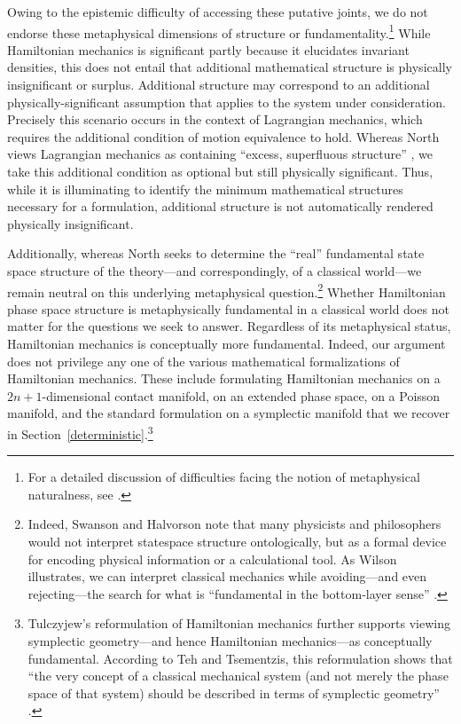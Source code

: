 \documentclass[12pt, english, twoside]{article} %
\begin{document}
Owing to the epistemic difficulty of accessing these putative joints, we do not endorse these metaphysical dimensions of structure or fundamentality.\footnote{For a detailed discussion of difficulties facing the notion of metaphysical naturalness, see \textcites[]{Dorr_Hawthorne}.} While Hamiltonian mechanics is significant partly because it elucidates invariant densities, this does not entail that additional mathematical structure is physically insignificant or surplus. Additional structure may correspond to an additional physically-significant assumption that applies to the system under consideration. Precisely this scenario occurs in the context of Lagrangian mechanics, which requires the additional condition of motion equivalence to hold. Whereas North views Lagrangian mechanics as containing ``excess, superfluous structure'' \parencites*[75]{North}, we take this additional condition as optional but still physically significant. Thus, while it is illuminating to identify the minimum mathematical structures necessary for a formulation, additional structure is not automatically rendered physically insignificant. 

Additionally, whereas North \parencites*[76]{North} seeks to determine the ``real'' fundamental state space structure of the theory---and correspondingly, of a classical world---we remain neutral on this underlying metaphysical question.\footnote{Indeed, Swanson and Halvorson \parencites*[]{Swanson} note that many physicists and philosophers would not interpret statespace structure ontologically, but as a formal device for encoding physical information or a calculational tool. As Wilson illustrates, we can interpret classical mechanics while avoiding---and even rejecting---the search for what is ``fundamental in the bottom-layer sense'' \parencites*[53]{Wilson}.} Whether Hamiltonian phase space structure is metaphysically fundamental in a classical world does not matter for the questions we seek to answer. Regardless of its metaphysical status, Hamiltonian mechanics is conceptually more fundamental. Indeed, our argument does not privilege any one of the various mathematical formalizations of Hamiltonian mechanics. These include formulating Hamiltonian mechanics on a $2n+1$-dimensional contact manifold, on an extended phase space, on a Poisson manifold, and the standard formulation on a symplectic manifold that we recover in Section~\ref{deterministic}.\footnote{Tulczyjew's reformulation of Hamiltonian mechanics further supports viewing symplectic geometry---and hence Hamiltonian mechanics---as conceptually fundamental. According to Teh and Tsementzis, this reformulation shows that  ``the very concept of a classical mechanical system (and not merely the phase space of that system) should be described in terms of symplectic geometry'' \parencites*[46]{Teh}.}
\end{document}
